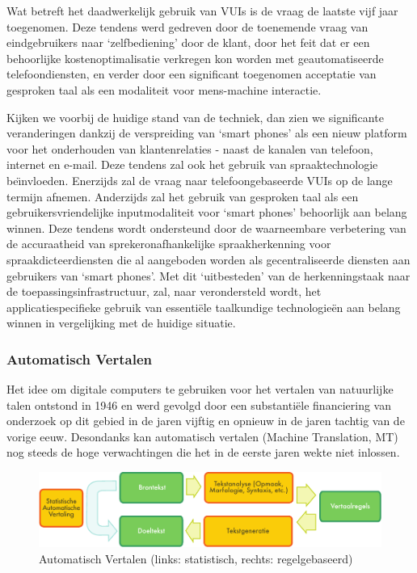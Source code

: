 \begin{multicols}{2}
    Wat betreft het daadwerkelijk gebruik van VUIs is de vraag de laatste vijf jaar toegenomen. Deze tendens werd gedreven door de toenemende vraag van eindgebruikers naar `zelfbediening' door de klant, door het feit dat er een behoorlijke kostenoptimalisatie verkregen kon worden met geautomatiseerde telefoondiensten, en verder door een significant toegenomen acceptatie van gesproken taal als een modaliteit voor mens-machine interactie.

    Kijken we voorbij de huidige stand van de techniek, dan zien we significante veranderingen dankzij de verspreiding van `smart phones' als een nieuw platform voor het onderhouden van klantenrelaties - naast de kanalen van telefoon, internet en e-mail. Deze tendens zal ook het gebruik van spraaktechnologie \mbox{be{\"\i}nvloeden}. Enerzijds zal de vraag naar telefoongebaseerde VUIs op de lange termijn afnemen. Anderzijds zal het gebruik van gesproken taal als een gebruikersvriendelijke inputmodaliteit voor `smart phones' behoorlijk aan belang winnen. Deze tendens wordt ondersteund door de waarneembare verbetering van de accuraatheid van sprekeronafhankelijke spraakherkenning voor spraakdicteerdiensten die al aangeboden worden als gecentraliseerde diensten aan gebruikers van `smart phones'. Met dit `uitbesteden' van de herkenningstaak naar de toepassingsinfrastructuur, zal, naar verondersteld wordt, het applicatiespecifieke gebruik van essenti{\"e}le taalkundige technologie{\"e}n aan belang winnen in vergelijking met de huidige situatie.

\subsubsection{Automatisch Vertalen}

  Het idee om digitale computers te gebruiken voor het vertalen van natuurlijke talen ontstond in 1946  en werd gevolgd door een substanti{\"e}le financiering van onderzoek op dit gebied in de jaren vijftig en opnieuw in de jaren tachtig van de vorige eeuw. Desondanks kan automatisch vertalen (Machine Translation, MT) nog steeds de hoge verwachtingen die het in de eerste jaren wekte niet inlossen.

\begin{figure}[htb]
  \center
  \includegraphics[width=\textwidth]{../_media/dutch/machine_translation}
  \vspace{-2mm}
  \caption{Automatisch Vertalen (links: statistisch, rechts: regelgebaseerd)}
  \label{fig:mtarch_de}
\end{figure}


\end{multicols}
